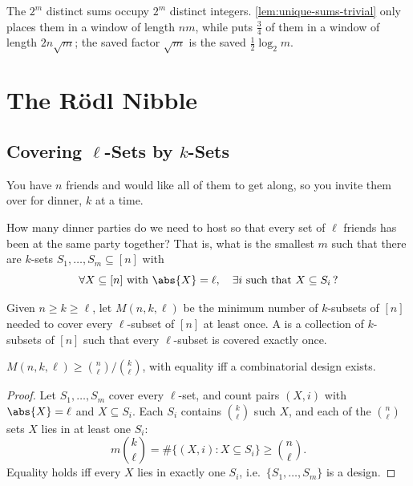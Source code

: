The \(2^{m}\) distinct sums occupy \(2^{m}\) distinct integers. \autoref{lem:unique-sums-trivial} only places them in a window of length \(nm\), while  puts \(\frac{3}{4}\) of them in a window of length \(2n\sqrt{m}\); the saved factor \(\sqrt{m}\) is the saved \(\frac{1}{2}\log_2 m\).

\chapter{The R\"odl Nibble}

\section{Covering \texorpdfstring{\(\ell\)}{l}-Sets by \texorpdfstring{\(k\)}{k}-Sets}\label{sec:covering}

You have \(n\) friends and would like all of them to get along, so you invite them over for dinner, \(k\) at a time.

\begin{question}\label{q:dinner-parties}
    How many dinner parties do we need to host so that every set of \(\ell\) friends has been at the same party together? That is, what is the smallest \(m\) such that there are \(k\)-sets \(S_1, \ldots, S_m \subseteq [n]\) with
    \[
        \forall X \subseteq [n] \text{ with } \abs{X} = \ell, \quad \exists i \text{ such that } X \subseteq S_i \, ?
    \]
\end{question}

\begin{definition}\label{def:covering}
    Given \(n \ge k \ge \ell\), let \(M(n,k,\ell)\) be the minimum number of \(k\)-subsets of \([n]\) needed to cover every \(\ell\)-subset of \([n]\) at least once. A  is a collection of \(k\)-subsets of \([n]\) such that every \(\ell\)-subset is covered exactly once.
\end{definition}

\begin{proposition}\label{prop:covering-lower}
    \(M(n,k,\ell) \ge \binom{n}{\ell} \big/ \binom{k}{\ell}\), with equality iff a combinatorial design exists.
\end{proposition}

\begin{proof}
    Let \(S_1, \ldots, S_m\) cover every \(\ell\)-set, and count pairs \((X, i)\) with \(\abs{X} = \ell\) and \(X \subseteq S_i\). Each \(S_i\) contains \(\binom{k}{\ell}\) such \(X\), and each of the \(\binom{n}{\ell}\) sets \(X\) lies in at least one \(S_i\):
    \[
        m \binom{k}{\ell} = \#\bigl\{ (X, i) : X \subseteq S_i \bigr\} \ge \binom{n}{\ell} .
    \]
    Equality holds iff every \(X\) lies in exactly one \(S_i\), i.e.\ \(\{S_1, \ldots, S_m\}\) is a design.
\end{proof}

